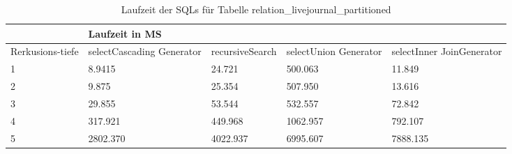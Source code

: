 \begin{table}[H]
	\centering
	\begin{tabular}{l|l|l|l|l|l|}
		\cline{2-6}
		& \multicolumn{5}{|l|}{Laufzeit in MS}                                                                                                                                                  \\ \hline
		\multicolumn{1}{|l|}{\multirow{2}{2cm}{Rerkusions-tiefe}} & \multicolumn{2}{|l|}{\multirow{2}{3cm}{selectCascading Generator}} & \multirow{2}{2.8cm}{recursiveSearch} & \multirow{2}{2.5cm}{selectUnion Generator} & \multirow{2}{2.5cm}{selectInner JoinGenerator} \\
		\multicolumn{1}{|l|}{}
		& \multicolumn{2}{|l|}{}                                           &                                  &                                     &                                           \\ \hline
		
		\multicolumn{1}{|l|}{1}                                 & \multicolumn{2}{l|}{8.9415}                                      & 24.721                                                & 500.063                                                   & 11.849                                                          \\ \hline
		\multicolumn{1}{|l|}{2}                                 & \multicolumn{2}{l|}{9.875}                                       & 25.354                                                & 507.950                                                   & 13.616                                                          \\ \hline
		\multicolumn{1}{|l|}{3}                                 & \multicolumn{2}{l|}{29.855}                                      & 53.544                                                & 532.557                                                   & 72.842                                                          \\ \hline
		\multicolumn{1}{|l|}{4}                                 & \multicolumn{2}{l|}{317.921}                                     & 449.968                                               & 1062.957                                                  & 792.107                                                         \\ \hline
		\multicolumn{1}{|l|}{5}                                 & \multicolumn{2}{l|}{2802.370}                                    & 4022.937                                              & 6995.607                                                  & 7888.135                                                        \\ \hline
		
		
		
	\end{tabular}
	\caption{Laufzeit der SQLs für Tabelle relation\_livejournal\_partitioned}
	\label{2.relationlivejournalpartion.table}
\end{table}
